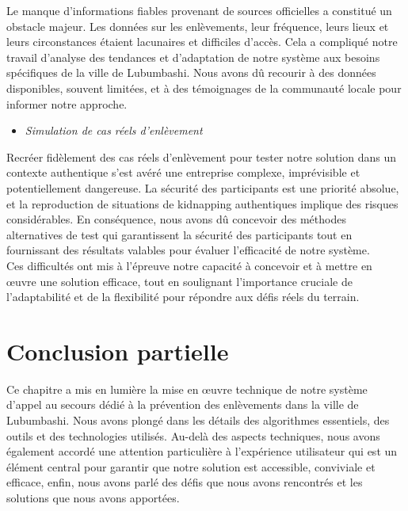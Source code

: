 Le manque d'informations fiables provenant de sources officielles a constitué un obstacle majeur. Les données sur les enlèvements, leur fréquence, leurs lieux et leurs circonstances étaient lacunaires et difficiles d'accès. Cela a compliqué notre travail d'analyse des tendances et d'adaptation de notre système aux besoins spécifiques de la ville de Lubumbashi. Nous avons dû recourir à des données disponibles, souvent limitées, et à des témoignages de la communauté locale pour informer notre approche.

\begin{itemize}
	\item \textit{Simulation de cas réels d’enlèvement}
\end{itemize}

Recréer fidèlement des cas réels d'enlèvement pour tester notre solution dans un contexte authentique s'est avéré une entreprise complexe, imprévisible et potentiellement dangereuse. La sécurité des participants est une priorité absolue, et la reproduction de situations de kidnapping authentiques implique des risques considérables. En conséquence, nous avons dû concevoir des méthodes alternatives de test qui garantissent la sécurité des participants tout en fournissant des résultats valables pour évaluer l'efficacité de notre système.\\

Ces difficultés ont mis à l'épreuve notre capacité à concevoir et à mettre en œuvre une solution efficace, tout en soulignant l'importance cruciale de l'adaptabilité et de la flexibilité pour répondre aux défis réels du terrain.

\section{ Conclusion partielle}
Ce chapitre a mis en lumière la mise en œuvre technique de notre système d'appel au secours dédié à la prévention des enlèvements dans la ville de Lubumbashi. Nous avons plongé dans les détails des algorithmes essentiels, des outils et des technologies utilisés. Au-delà des aspects techniques, nous avons également accordé une attention particulière à l'expérience utilisateur qui est un élément central pour garantir que notre solution est accessible, conviviale et efficace, enfin, nous avons parlé des défis que nous avons rencontrés et les solutions que nous avons apportées.
